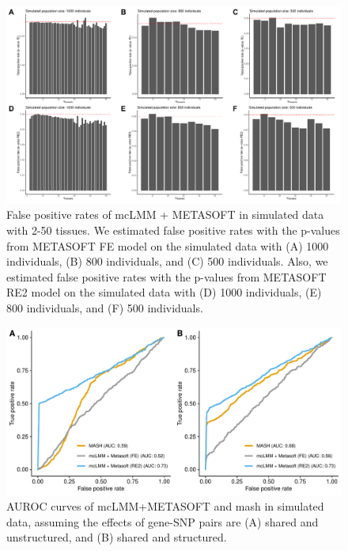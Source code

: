         \begin{figure}
            \centering
            \includegraphics[width=\textwidth]{chapter3/figures/Figure_3.pdf}
            \caption{False positive rates of mcLMM + METASOFT in simulated data with 2-50 tissues. We estimated false positive rates with the p-values from METASOFT FE model on the simulated data with (A) 1000 individuals, (B) 800 individuals, and (C) 500 individuals. Also, we estimated false positive rates with the p-values from METASOFT RE2 model on the simulated data with (D) 1000 individuals, (E) 800 individuals, and (F) 500 individuals.}
            \label{fig:fig3}
        \end{figure}
        
        \begin{figure}
            \centering
            \includegraphics[width=\textwidth]{chapter3/figures/Figure_4.pdf}
            \caption{AUROC curves of mcLMM+METASOFT and mash in simulated data, assuming the effects of gene-SNP pairs are (A) shared and unstructured, and (B) shared and structured.}
            \label{fig:fig4}
        \end{figure}

